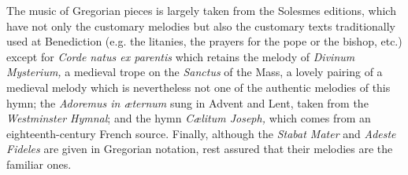 \begin{enpars}
The music of Gregorian pieces is largely taken from the Solesmes editions, which have not only the customary melodies but also the customary texts traditionally used at Benediction (e.g. the litanies, the prayers for the pope or the bishop, etc.) except for \textit{Corde natus ex parentis} which retains the melody of \textit{Divinum Mysterium,} a medieval trope on the \textit{Sanctus} of the Mass, a lovely pairing of a medieval melody which is nevertheless not one of the authentic melodies of this hymn; the \textit{Adoremus in æternum} sung in Advent and Lent, taken from the \textit{Westminster Hymnal}; and the hymn \textit{Cælitum Joseph,} which comes from an eighteenth-century French source. Finally, although the \textit{Stabat Mater} and \textit{Adeste Fideles} are given in Gregorian notation, rest assured that their melodies are the familiar ones.
\end{enpars}